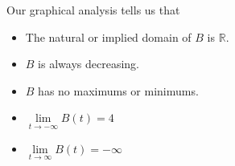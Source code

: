 \documentclass{ximera}
\begin{document}
\begin{example}
\begin{explanation}
\begin{image}
\end{image}




Our graphical analysis tells us that 

\begin{itemize}
\item The natural or implied domain of $B$ is $\mathbb{R}$.
\item $B$ is always decreasing.
\item $B$ has no maximums or minimums.
\item $\lim\limits_{t \to -\infty} B(t) = 4$
\item $\lim\limits_{t \to \infty} B(t) = -\infty$
\end{itemize}


\end{explanation}

\end{example}
\end{document}
